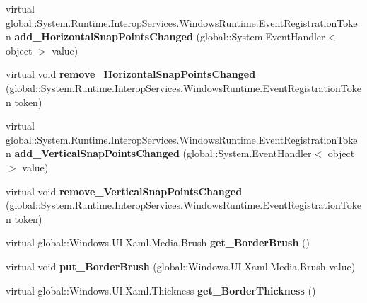 \begin{DoxyCompactItemize}
virtual global\+::\+System.\+Runtime.\+Interop\+Services.\+Windows\+Runtime.\+Event\+Registration\+Token {\bfseries add\+\_\+\+Horizontal\+Snap\+Points\+Changed} (global\+::\+System.\+Event\+Handler$<$ object $>$ value)
\item 
\mbox{\label{class_windows_1_1_u_i_1_1_xaml_1_1_controls_1_1_stack_panel_aabdd867d8e829595aa1cd0066bb43b7c}} 
virtual void {\bfseries remove\+\_\+\+Horizontal\+Snap\+Points\+Changed} (global\+::\+System.\+Runtime.\+Interop\+Services.\+Windows\+Runtime.\+Event\+Registration\+Token token)
\item 
\mbox{\label{class_windows_1_1_u_i_1_1_xaml_1_1_controls_1_1_stack_panel_ad8defe3d3a6f357c9736a835aaf0d633}} 
virtual global\+::\+System.\+Runtime.\+Interop\+Services.\+Windows\+Runtime.\+Event\+Registration\+Token {\bfseries add\+\_\+\+Vertical\+Snap\+Points\+Changed} (global\+::\+System.\+Event\+Handler$<$ object $>$ value)
\item 
\mbox{\label{class_windows_1_1_u_i_1_1_xaml_1_1_controls_1_1_stack_panel_ad941c568cedfbb247496984f450b1857}} 
virtual void {\bfseries remove\+\_\+\+Vertical\+Snap\+Points\+Changed} (global\+::\+System.\+Runtime.\+Interop\+Services.\+Windows\+Runtime.\+Event\+Registration\+Token token)
\item 
\mbox{\label{class_windows_1_1_u_i_1_1_xaml_1_1_controls_1_1_stack_panel_ade57d63ba167e564115c51076407b86d}} 
virtual global\+::\+Windows.\+U\+I.\+Xaml.\+Media.\+Brush {\bfseries get\+\_\+\+Border\+Brush} ()
\item 
\mbox{\label{class_windows_1_1_u_i_1_1_xaml_1_1_controls_1_1_stack_panel_a9465b7d293751e261c9deb8f5bbc74f1}} 
virtual void {\bfseries put\+\_\+\+Border\+Brush} (global\+::\+Windows.\+U\+I.\+Xaml.\+Media.\+Brush value)
\item 
\mbox{\label{class_windows_1_1_u_i_1_1_xaml_1_1_controls_1_1_stack_panel_a9293dc30db12d0f3fb0b1465b4f79c8f}} 
virtual global\+::\+Windows.\+U\+I.\+Xaml.\+Thickness {\bfseries get\+\_\+\+Border\+Thickness} ()

\end{DoxyCompactItemize}
